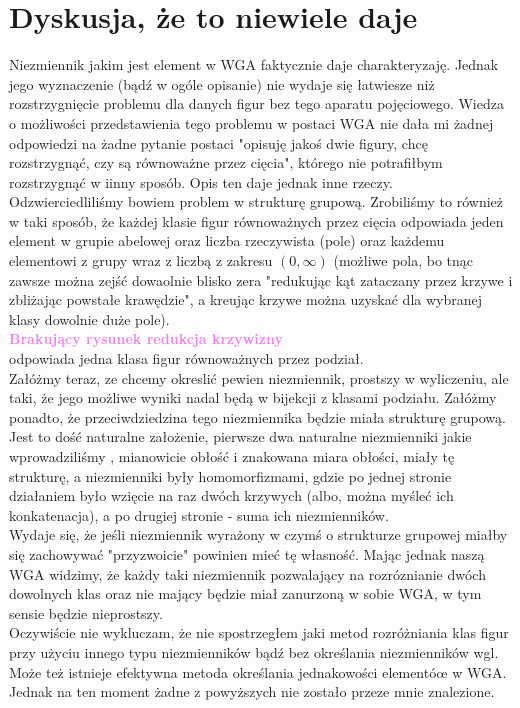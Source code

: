 \documentclass[a4paper, 12pt]{article}
\newcommand{\rysunek}[1]{\hfill \break\\[16pt] \Huge \textbf{\textcolor{violet}{Brakujący rysunek \normalsize
#1}} \hfill
\break \\[16pt] \normalsize}
\begin{document}
\section{Dyskusja, że to niewiele daje}
Niezmiennik jakim jest element w WGA faktycznie daje charakteryzaję. Jednak jego wyznaczenie (bądź w ogóle
opisanie) nie wydaje się łatwiesze niż rozstrzygnięcie problemu dla danych figur bez tego aparatu
pojęciowego. Wiedza o możliwości przedstawienia tego problemu w postaci WGA nie dała mi żadnej odpowiedzi
na żadne pytanie postaci "opisuję jakoś dwie figury, chcę rozstrzygnąć, czy są równoważne przez cięcia",
którego nie potrafiłbym rozstrzygnąć w iinny sposób. Opis ten daje jednak inne rzeczy.\\
Odzwierciedliliśmy bowiem problem w strukturę grupową. Zrobiliśmy to również w taki sposób, że każdej klasie
figur równoważnych przez cięcia odpowiada jeden element w grupie abelowej oraz liczba rzeczywista (pole)
oraz każdemu elementowi z grupy wraz z liczbą z zakresu $(0, \infty)$ (możliwe pola, bo tnąc zawsze można
zejść dowaolnie blisko zera "redukując kąt zataczany przez krzywe i zbliżając powstałe krawędzie", a
kreując krzywe można uzyskać dla wybranej klasy dowolnie duże pole).
\rysunek{redukcja krzywizny}
odpowiada jedna klasa figur równoważnych przez podział. \\
Załóżmy teraz, ze chcemy okreslić pewien niezmiennik, prostszy w wyliczeniu, ale taki, że jego możliwe wyniki
nadal będą w bijekcji z klasami podziału. Załóżmy ponadto, że przeciwdziedzina tego niezmiennika będzie miała
strukturę grupową. Jest to dość naturalne założenie, pierwsze dwa naturalne niezmienniki jakie wprowadziliśmy
, mianowicie obłość i znakowana miara obłości, miały tę strukturę, a niezmienniki były homomorfizmami,
gdzie po jednej stronie działaniem było wzięcie na raz dwóch krzywych (albo, można myśleć ich konkatenacja),
a po drugiej stronie - suma ich niezmienników. \\
Wydaje się, że jeśli niezmiennik wyrażony w czymś o strukturze grupowej miałby się zachowywać "przyzwoicie"
powinien mieć tę własność. Mając jednak naszą WGA widzimy, że każdy taki niezmiennik pozwalający na
rozróznianie dwóch dowolnych klas oraz nie mający będzie miał zanurzoną w sobie WGA, w tym sensie będzie
nieprostszy. \\
Oczywiście nie wykluczam, że nie spostrzegłem jaki metod rozróżniania klas figur przy użyciu innego typu
niezmienników bądź bez określania niezmienników wgl. Może też istnieje efektywna metoda określania
jednakowości elementóœ w WGA. Jednak na ten moment żadne z powyższych nie zostało przeze mnie znalezione.
\end{document}
